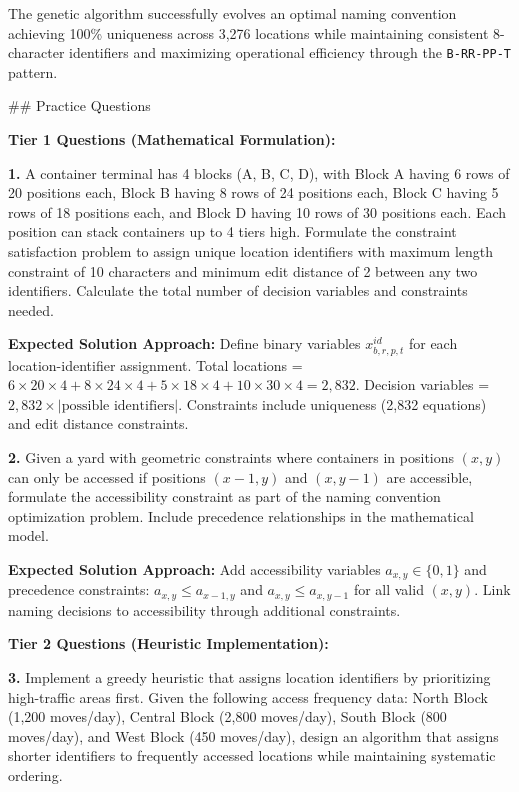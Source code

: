\documentclass{article}
\begin{document}
The genetic algorithm successfully evolves an optimal naming convention achieving 100\% uniqueness across 3,276 locations while maintaining consistent 8-character identifiers and maximizing operational efficiency through the \texttt{B-RR-PP-T} pattern.

## Practice Questions

\textbf{Tier 1 Questions (Mathematical Formulation):}

\textbf{1.} A container terminal has 4 blocks (A, B, C, D), with Block A having 6 rows of 20 positions each, Block B having 8 rows of 24 positions each, Block C having 5 rows of 18 positions each, and Block D having 10 rows of 30 positions each. Each position can stack containers up to 4 tiers high. Formulate the constraint satisfaction problem to assign unique location identifiers with maximum length constraint of 10 characters and minimum edit distance of 2 between any two identifiers. Calculate the total number of decision variables and constraints needed.

\textbf{Expected Solution Approach:} Define binary variables $x_{b,r,p,t}^{id}$ for each location-identifier assignment. Total locations = $6 \times 20 \times 4 + 8 \times 24 \times 4 + 5 \times 18 \times 4 + 10 \times 30 \times 4 = 2,832$. Decision variables = $2,832 \times |\text{possible identifiers}|$. Constraints include uniqueness (2,832 equations) and edit distance constraints.

\textbf{2.} Given a yard with geometric constraints where containers in positions $(x,y)$ can only be accessed if positions $(x-1,y)$ and $(x,y-1)$ are accessible, formulate the accessibility constraint as part of the naming convention optimization problem. Include precedence relationships in the mathematical model.

\textbf{Expected Solution Approach:} Add accessibility variables $a_{x,y} \in \{0,1\}$ and precedence constraints: $a_{x,y} \leq a_{x-1,y}$ and $a_{x,y} \leq a_{x,y-1}$ for all valid $(x,y)$. Link naming decisions to accessibility through additional constraints.

\textbf{Tier 2 Questions (Heuristic Implementation):}

\textbf{3.} Implement a greedy heuristic that assigns location identifiers by prioritizing high-traffic areas first. Given the following access frequency data: North Block (1,200 moves/day), Central Block (2,800 moves/day), South Block (800 moves/day), and West Block (450 moves/day), design an algorithm that assigns shorter identifiers to frequently accessed locations while maintaining systematic ordering.
\end{document}
